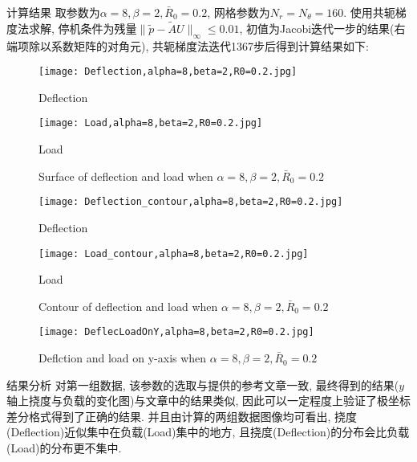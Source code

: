 \documentclass{article}
\begin{document}
\begin{section}{计算结果}
取参数为$\alpha=8,\beta=2,\bar{R}_0=0.2$, 网格参数为$N_r=N_\theta=160$. 使用共轭梯度法求解, 停机条件为残量$\|\tilde{p}-\tilde{A}U\|_\infty\leq 0.01$, 初值为Jacobi迭代一步的结果(右端项除以系数矩阵的对角元),
共轭梯度法迭代1367步后得到计算结果如下:
\begin{figure}[htbp]
\begin{minipage}[t]{0.35\linewidth}
\centering
\texttt{[image: Deflection,alpha=8,beta=2,R0=0.2.jpg]}
\caption{Deflection}
\end{minipage}%
\hfill
\begin{minipage}[t]{0.5\linewidth}
\centering
\texttt{[image: Load,alpha=8,beta=2,R0=0.2.jpg]}
\caption{Load}
\end{minipage}
\caption{Surface of deflection and load when $\alpha=8,\beta=2,\bar{R}_0=0.2$}
\end{figure}

\begin{figure}[htbp]
\begin{minipage}[t]{0.35\linewidth}
\centering
\texttt{[image: Deflection\_contour,alpha=8,beta=2,R0=0.2.jpg]}
\caption{Deflection}
\end{minipage}%
\hfill
\begin{minipage}[t]{0.5\linewidth}
\centering
\texttt{[image: Load\_contour,alpha=8,beta=2,R0=0.2.jpg]}
\caption{Load}
\end{minipage}
\caption{Contour of deflection and load when $\alpha=8,\beta=2,\bar{R}_0=0.2$}
\end{figure}

\begin{figure}[htbp]
    \centering
    \texttt{[image: DeflecLoadOnY,alpha=8,beta=2,R0=0.2.jpg]}
    \caption{Deflction and load on y-axis when $\alpha=8,\beta=2,\bar{R}_0=0.2$}
\end{figure}

\end{section}

\begin{section}{结果分析}
对第一组数据, 该参数的选取与提供的参考文章一致, 最终得到的结果($y$轴上挠度与负载的变化图)与文章中的结果类似, 
因此可以一定程度上验证了极坐标差分格式得到了正确的结果. 并且由计算的两组数据图像均可看出, 挠度(Deflection)近似集中在负载(Load)集中的地方,
且挠度(Deflection)的分布会比负载(Load)的分布更不集中.
\end{section}
\end{document}
